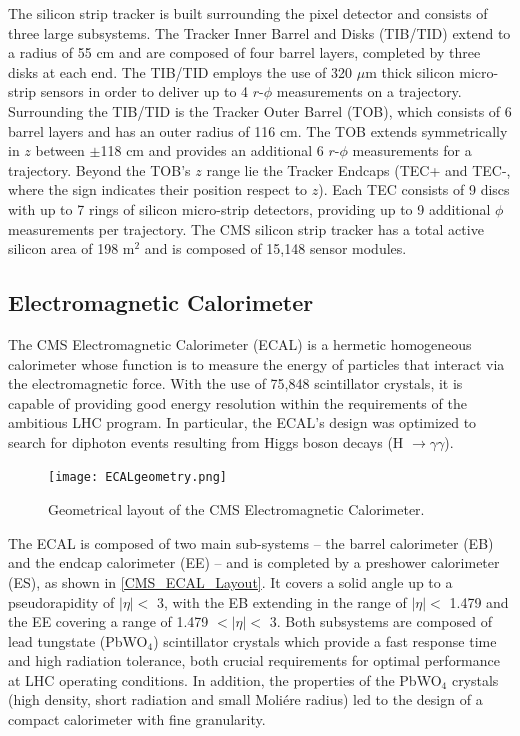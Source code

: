 The silicon strip tracker is built surrounding the pixel detector and consists of three large subsystems. The Tracker Inner Barrel and Disks (TIB/TID) extend to a radius of 55 cm and are composed of four barrel layers, completed by three disks at each end. The TIB/TID employs the use of 320 $\mu$m thick silicon micro-strip sensors in order to deliver up to 4 $r$-$\phi$ measurements on a trajectory. Surrounding the TIB/TID is the Tracker Outer Barrel (TOB), which consists of 6 barrel layers and has an outer radius of 116 cm. The TOB extends symmetrically in $z$ between $\pm$118 cm and provides an additional 6 $r$-$\phi$ measurements for a trajectory. Beyond the TOB's $z$ range lie the Tracker Endcaps (TEC+ and TEC-, where the sign indicates their position respect to $z$). Each TEC consists of 9 discs with up to 7 rings of silicon micro-strip detectors, providing up to 9 additional $\phi$ measurements per trajectory. The CMS silicon strip tracker has a total active silicon area of 198 m$^2$ and is composed of 15,148 sensor modules.

\subsection{Electromagnetic Calorimeter}
The CMS Electromagnetic Calorimeter (ECAL) is a hermetic homogeneous calorimeter whose function is to measure the energy of particles that interact via the electromagnetic force. With the use of 75,848 scintillator crystals, it is capable of providing good energy resolution within the requirements of the ambitious LHC program. In particular, the ECAL's design was optimized to search for diphoton events resulting from Higgs boson decays (H $\rightarrow \gamma \gamma$).\\ 

\begin{figure}[tb]
\begin{center}
\texttt{[image: ECALgeometry.png]} 
\caption{Geometrical layout of the CMS Electromagnetic Calorimeter\cite{CMSLHC}.}
\label{CMS_ECAL_Geometry} 
\hspace{4em}
\end{center}
\end{figure}

The ECAL is composed of two main sub-systems -- the barrel calorimeter (EB) and the endcap calorimeter (EE) -- and is completed by a preshower calorimeter (ES), as shown in \autoref{CMS_ECAL_Layout}. It covers a solid angle up to a pseudorapidity of $|\eta| <$ 3, with the EB extending in the range of $|\eta| <$ 1.479 and the EE covering a range of  1.479 $< |\eta| <$ 3. Both subsystems are composed of lead tungstate (PbWO$_4$) scintillator crystals which provide a fast response time and high radiation tolerance, both crucial requirements for optimal performance at LHC operating conditions. In addition, the properties of the PbWO$_4$ crystals (high density, short radiation and small Moli\'ere radius) led to the design of a compact calorimeter with fine granularity.\\

